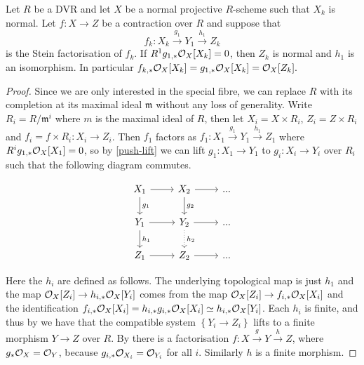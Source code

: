 	\begin{theorem}\label{adj-push}
		Let $R$ be a DVR and let $X$ be a normal projective $R$-scheme such that $X_{k}$ is normal. 
		Let $f \colon X \to Z$ be a contraction over $R$ and suppose that $$f_{k}\colon X_{k} \xrightarrow{g_{1}} Y_{1} \xrightarrow{h_{1}} Z_{k}$$ is the Stein factorisation of $f_{k}$. If $R^{1}g_{1,*} \mathcal{O}_{X}[X_{k}]=0$, then $Z_k$ is normal and $h_{1}$ is an isomorphism. In particular $f_{k,*}\mathcal{O}_{X}[X_{k}]=g_{1,*}\mathcal{O}_{X}[X_{k}]=\mathcal{O}_{X}[Z_{k}].$
	\end{theorem}
	
	\begin{proof}
		Since we are only interested in the special fibre, we can replace $R$ with its completion at its maximal ideal $\mathfrak{m}$ without any loss of generality.
		Write $R_{i}=R/\mathfrak{m}^{i}$ where $m$ is the maximal ideal of $R$, then let $X_{i}=X \times R_{i}$, $Z_{i}=Z\times R_{i}$ and $f_{i}=f\times R_{i}\colon X_{i} \to Z_{i}$.
		Then $f_{1}$ factors as $f_{1}\colon X_{1} \xrightarrow{g_{1}} Y_{1} \xrightarrow{h_{1}} Z_{1}$ where $R^{i}g_{1,*}\mathcal{O}_{X}[X_{1}]=0$, so by \autoref{push-lift} we can lift $g_{1}\colon X_{1} \to Y_{1}$ to $g_{i}\colon X_{i} \to Y_{i}$ over $R_{i}$ such that the following diagram commutes.
		
		\[\begin{tikzcd}
			X_{1} \arrow[r] \arrow[d, "g_{1}"] & X_{2} \arrow[r] \arrow[d, "g_{2}"] & ... \\
			Y_{1} \arrow[r] \arrow[d, "h_{1}"] & Y_{2} \arrow[d, dotted, "h_{2}"] \arrow[r]  & ... \\
			Z_{1} \arrow[r]                    & Z_{2} \arrow[r]                    & ...
		\end{tikzcd}\]
		
		Here the $h_{i}$ are defined as follows. The underlying topological map is just $h_{1}$ and the map $\mathcal{O}_{X}[Z_{i}] \to h_{i,*}\mathcal{O}_{X}[Y_{i}]$ comes from the map ${\mathcal{O}_{X}[Z_{i}] \to f_{i,*}\mathcal{O}_{X}[X_{i}]}$ and the identification $f_{i,*}\mathcal{O}_{X}[X_{i}]=h_{i,*}g_{i,*}\mathcal{O}_{X}[X_{i}]\simeq h_{i,*}\mathcal{O}_{X}[Y_{i}]$.
		Each $h_{i}$ is finite, and thus by
		\cite[\href{https://stacks.math.columbia.edu/tag/09ZT}{Tag 09ZT}]{stacks-project} we have that the compatible system $\left\{Y_{i} \to Z_i \right\}$ lifts to a finite morphism $Y \to Z$ over $R$. By \cite[\href{https://stacks.math.columbia.edu/tag/0A42}{Tag 0A42}]{stacks-project} there is a factorisation ${f\colon X \xrightarrow{g} Y \xrightarrow{h} Z}$, where $g_{*}\mathcal{O}_{X} = \mathcal{O}_Y$, because $g_{i,*}\mathcal{O}_{X_i}=\mathcal{O}_{Y_i}$ for all $i$. Similarly $h$ is a finite morphism. 
		

\end{proof}
